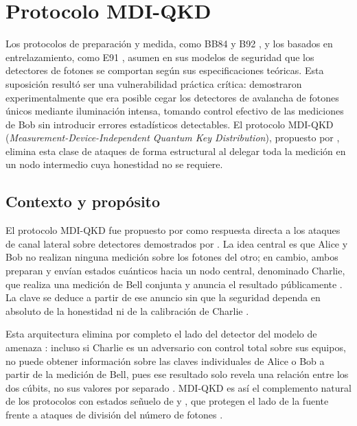 \section{Protocolo MDI-QKD}

Los protocolos de preparación y medida, como BB84 \citep{bennett1984} y B92 \citep{bennett1992}, y los basados en entrelazamiento, como E91 \citep{ekert1991}, asumen en sus modelos de seguridad que los detectores de fotones se comportan según sus especificaciones teóricas. Esta suposición resultó ser una vulnerabilidad práctica crítica: \cite{lydersen2010} demostraron experimentalmente que era posible cegar los detectores de avalancha de fotones únicos mediante iluminación intensa, tomando control efectivo de las mediciones de Bob sin introducir errores estadísticos detectables. El protocolo MDI-QKD (\emph{Measurement-Device-Independent Quantum Key Distribution}), propuesto por \cite{lo2012}, elimina esta clase de ataques de forma estructural al delegar toda la medición en un nodo intermedio cuya honestidad no se requiere.

\subsection{Contexto y propósito}

El protocolo MDI-QKD fue propuesto por \cite{lo2012} como respuesta directa a los ataques de canal lateral sobre detectores demostrados por \cite{lydersen2010}. La idea central es que Alice y Bob no realizan ninguna medición sobre los fotones del otro; en cambio, ambos preparan y envían estados cuánticos hacia un nodo central, denominado Charlie, que realiza una medición de Bell conjunta y anuncia el resultado públicamente \citep{lo2012,braunstein2012}. La clave se deduce a partir de ese anuncio sin que la seguridad dependa en absoluto de la honestidad ni de la calibración de Charlie \citep{lo2012,curty2014}.

Esta arquitectura elimina por completo el lado del detector del modelo de amenaza \citep{lo2012}: incluso si Charlie es un adversario con control total sobre sus equipos, no puede obtener información sobre las claves individuales de Alice o Bob a partir de la medición de Bell, pues ese resultado solo revela una relación entre los dos cúbits, no sus valores por separado \citep{lo2012,braunstein2012}. MDI-QKD es así el complemento natural de los protocolos con estados señuelo de \cite{lo2005} y \cite{wang2005}, que protegen el lado de la fuente frente a ataques de división del número de fotones \citep{hwang2003}.


